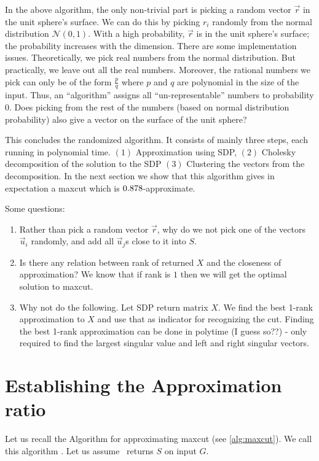 \documentclass[12pt,
    driverfallback=dvipdfm,
 	openany,
    a4paper,
    toc=bibliography,
    twoside,
    numbers=noenddot]{article}              %
\begin{document}
\begin{mdframed}[backgroundcolor=light-gray, linecolor=light-gray]
In the above algorithm, the only non-trivial part is picking a random vector $\vec r$ in the unit sphere's surface. We can do this by picking $r_i$ randomly from the normal distribution $\mathcal{N}(0,1)$. With a high probability, $\vec r$ is in the unit sphere's surface; the probability increases with the dimension. There are some implementation issues. Theoretically, we pick real numbers from the normal distribution. But practically, we leave out all the real numbers. Moreover, the rational numbers we pick can only be of the form $\frac{p}{q}$ where $p$ and $q$ are polynomial in the size of the input. Thus, an ``algorithm'' assigns all ``un-representable'' numbers to probability $0$. Does picking from the rest of the numbers (based on normal distribution probability) also give a vector on the surface of the unit sphere? 
\end{mdframed}

This concludes the randomized algorithm. It consists of mainly three steps, each running in polynomial time. $(1)$ Approximation using SDP, $(2)$ Cholesky decomposition of the solution to the SDP $(3)$ Clustering the vectors from the decomposition. In the next section we show that this algorithm gives in expectation a maxcut which is $0.878$-approximate.


\begin{mdframed}[backgroundcolor=light-gray, linecolor=light-gray]
Some questions:
\begin{enumerate}
\item Rather than pick a random vector $\vec r$, why do we not pick one of the vectors $\vec u_i$ randomly, and add all $\vec u_j$s close to it into $S$.
\item Is there any relation between rank of returned $X$ and the closeness of approximation? We know that if rank is $1$ then we will get the optimal solution to maxcut.
\item Why not do the following. Let SDP return matrix $X$. We find the best 1-rank approximation to $X$ and use that as indicator for recognizing the cut. Finding the best 1-rank approximation can be done in polytime (I guess so??) - only required to find the largest singular value and left and right singular vectors.
\end{enumerate}
\end{mdframed}


\section{Establishing the Approximation ratio}
Let us recall the Algorithm for approximating maxcut (see \cref{alg:maxcut}). We call this algorithm \A. Let us assume \A\ returns $S$ on input $G$.
\end{document}
